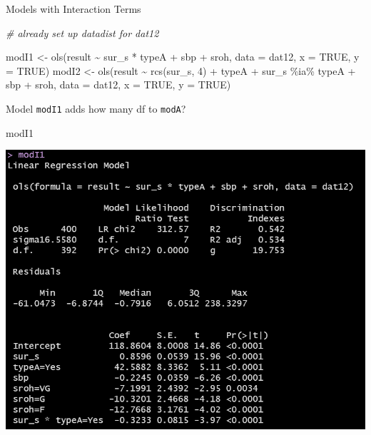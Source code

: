 \documentclass[
  ignorenonframetext,
]{beamer}
\newenvironment{Shaded}{\begin{snugshade}}{\end{snugshade}}
\newcommand{\AttributeTok}[1]{\textcolor[rgb]{0.77,0.63,0.00}{#1}}
\newcommand{\CommentTok}[1]{\textcolor[rgb]{0.56,0.35,0.01}{\textit{#1}}}
\newcommand{\ConstantTok}[1]{\textcolor[rgb]{0.00,0.00,0.00}{#1}}
\newcommand{\DecValTok}[1]{\textcolor[rgb]{0.00,0.00,0.81}{#1}}
\newcommand{\FunctionTok}[1]{\textcolor[rgb]{0.00,0.00,0.00}{#1}}
\newcommand{\NormalTok}[1]{#1}
\newcommand{\OtherTok}[1]{\textcolor[rgb]{0.56,0.35,0.01}{#1}}
\newcommand{\SpecialCharTok}[1]{\textcolor[rgb]{0.00,0.00,0.00}{#1}}
\begin{document}
\begin{frame}[fragile]{Models with Interaction Terms}
\protect\hypertarget{models-with-interaction-terms}{}
\begin{Shaded}
\begin{Highlighting}[]
\CommentTok{\# already set up datadist for dat12}

\NormalTok{modI1 }\OtherTok{\textless{}{-}} \FunctionTok{ols}\NormalTok{(result }\SpecialCharTok{\textasciitilde{}}\NormalTok{ sur\_s }\SpecialCharTok{*}\NormalTok{ typeA }\SpecialCharTok{+}\NormalTok{ sbp }\SpecialCharTok{+}\NormalTok{ sroh,}
             \AttributeTok{data =}\NormalTok{ dat12, }\AttributeTok{x =} \ConstantTok{TRUE}\NormalTok{, }\AttributeTok{y =} \ConstantTok{TRUE}\NormalTok{)}
\NormalTok{modI2 }\OtherTok{\textless{}{-}} \FunctionTok{ols}\NormalTok{(result }\SpecialCharTok{\textasciitilde{}} \FunctionTok{rcs}\NormalTok{(sur\_s, }\DecValTok{4}\NormalTok{) }\SpecialCharTok{+}\NormalTok{ typeA }\SpecialCharTok{+} 
\NormalTok{                 sur\_s }\SpecialCharTok{\%ia\%}\NormalTok{ typeA }\SpecialCharTok{+}\NormalTok{ sbp }\SpecialCharTok{+}\NormalTok{ sroh, }
             \AttributeTok{data =}\NormalTok{ dat12, }\AttributeTok{x =} \ConstantTok{TRUE}\NormalTok{, }\AttributeTok{y =} \ConstantTok{TRUE}\NormalTok{)}
\end{Highlighting}
\end{Shaded}
\end{frame}

\begin{frame}[fragile]{Model \texttt{modI1} adds how many df to
\texttt{modA}?}
\protect\hypertarget{model-modi1-adds-how-many-df-to-moda}{}
\begin{Shaded}
\begin{Highlighting}[]
\NormalTok{modI1}
\end{Highlighting}
\end{Shaded}

\begin{center}\includegraphics[width=11.29in,height=0.65\textheight]{figures/small7} \end{center}
\end{frame}
\end{document}
